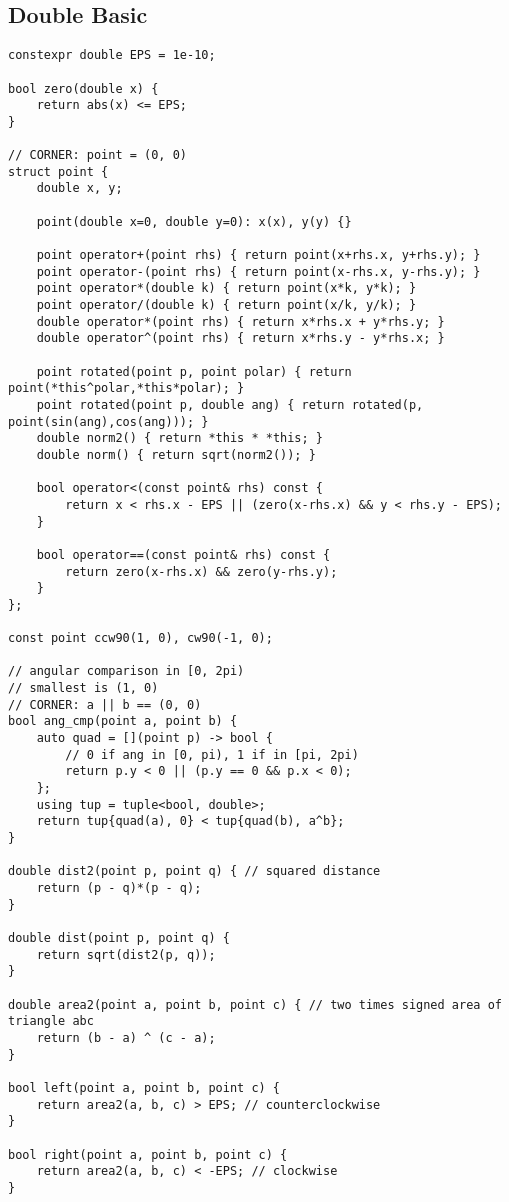 \documentclass{article}
\begin{document}
\subsection{Double Basic}
\begin{verbatim}
constexpr double EPS = 1e-10;

bool zero(double x) {
	return abs(x) <= EPS;
}

// CORNER: point = (0, 0)
struct point {
	double x, y;
	
	point(double x=0, double y=0): x(x), y(y) {}
	
	point operator+(point rhs) { return point(x+rhs.x, y+rhs.y); }
	point operator-(point rhs) { return point(x-rhs.x, y-rhs.y); }
	point operator*(double k) { return point(x*k, y*k); }
	point operator/(double k) { return point(x/k, y/k); }
	double operator*(point rhs) { return x*rhs.x + y*rhs.y; }
	double operator^(point rhs) { return x*rhs.y - y*rhs.x; }

	point rotated(point p, point polar) { return point(*this^polar,*this*polar); }
	point rotated(point p, double ang) { return rotated(p, point(sin(ang),cos(ang))); }
	double norm2() { return *this * *this; }
	double norm() { return sqrt(norm2()); }

	bool operator<(const point& rhs) const {
		return x < rhs.x - EPS || (zero(x-rhs.x) && y < rhs.y - EPS);
	}

	bool operator==(const point& rhs) const {
		return zero(x-rhs.x) && zero(y-rhs.y);
	}
};

const point ccw90(1, 0), cw90(-1, 0);

// angular comparison in [0, 2pi)
// smallest is (1, 0)
// CORNER: a || b == (0, 0)
bool ang_cmp(point a, point b) {
	auto quad = [](point p) -> bool {
		// 0 if ang in [0, pi), 1 if in [pi, 2pi)
		return p.y < 0 || (p.y == 0 && p.x < 0);
	};
	using tup = tuple<bool, double>;
	return tup{quad(a), 0} < tup{quad(b), a^b};
}

double dist2(point p, point q) { // squared distance
    return (p - q)*(p - q);
}

double dist(point p, point q) {
    return sqrt(dist2(p, q));
}

double area2(point a, point b, point c) { // two times signed area of triangle abc
	return (b - a) ^ (c - a);
}

bool left(point a, point b, point c) {
	return area2(a, b, c) > EPS; // counterclockwise
}

bool right(point a, point b, point c) {
	return area2(a, b, c) < -EPS; // clockwise
}


\end{verbatim}
\end{document}
